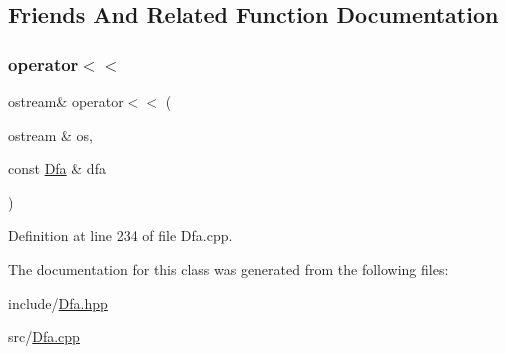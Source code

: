 \subsection{Friends And Related Function Documentation}
\mbox{\label{class_dfa_ae4bcdc6c0f5c2374f14902fd5e073c7d}} 
\subsubsection{\texorpdfstring{operator$<$$<$}{operator<<}}
{\footnotesize\ttfamily ostream\& operator$<$$<$ (\begin{DoxyParamCaption}\item[{ostream \&}]{os,  }\item[{const \hyperlink{class_dfa}{Dfa} \&}]{dfa }\end{DoxyParamCaption})\hspace{0.3cm}{\ttfamily [friend]}}



Definition at line 234 of file Dfa.\+cpp.



The documentation for this class was generated from the following files\+:\begin{DoxyCompactItemize}
\item 
include/\hyperlink{_dfa_8hpp}{Dfa.\+hpp}\item 
src/\hyperlink{_dfa_8cpp}{Dfa.\+cpp}\end{DoxyCompactItemize}
